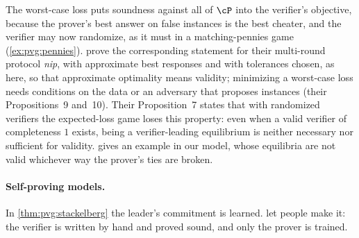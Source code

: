 \begin{refsection}
The worst-case loss puts soundness against all of $\cP$ into the verifier's objective, because the prover's best answer on false instances is the best cheater, and the verifier may now randomize, as it must in a matching-pennies game (\cref{ex:pvg:pennies}). \Textcite[Theorem~8]{HammondAdamDay2025} prove the corresponding statement for their multi-round protocol \emph{nip}, with approximate best responses and with tolerances chosen, as here, so that approximate optimality means validity; minimizing a worst-case loss needs conditions on the data or an adversary that proposes instances (their Propositions~9 and~10). Their Proposition~7 states that with randomized verifiers the expected-loss game loses this property: even when a valid verifier of completeness $1$ exists, being a verifier-leading equilibrium is neither necessary nor sufficient for validity.  gives an example in our model, whose equilibria are not valid whichever way the prover's ties are broken.

\paragraph{Self-proving models.} In \cref{thm:pvg:stackelberg} the leader's commitment is learned. \Textcite{AmitEtAl2025} let people make it: the verifier is written by hand and proved sound, and only the prover is trained.



\end{refsection}

